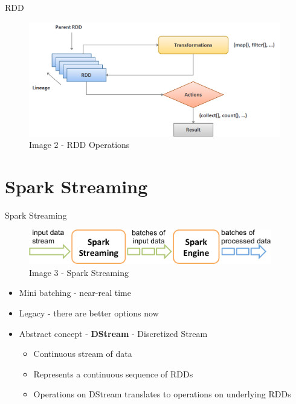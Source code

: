 \documentclass{beamer}
\begin{document}
\begin{frame}{RDD}
	\begin{center}
		\begin{figure}
			\includegraphics[height=5cm]{spark-rdd.png}
			\caption{Image 2 - RDD Operations}
		\end{figure}
	\end{center}
\end{frame}

\section{Spark Streaming}
\begin{frame}[t]{Spark Streaming}
	\begin{center}
		\begin{figure}
			\includegraphics[height=1.5cm]{streaming-flow.png}
			\caption{Image 3 - Spark Streaming}
		\end{figure}
	\end{center}
	\begin{itemize}
		\item<2-> Mini batching - near-real time
		\item<3-> Legacy - there are better options now
		\item<4-> Abstract concept - \textbf{DStream} - Discretized Stream
		\begin{itemize}
			\item<5-> Continuous stream of data
			\item<6-> Represents a continuous sequence of RDDs
			\item<7-> Operations on DStream translates to operations on underlying RDDs
		\end{itemize}
	\end{itemize}
\end{frame}
\end{document}

